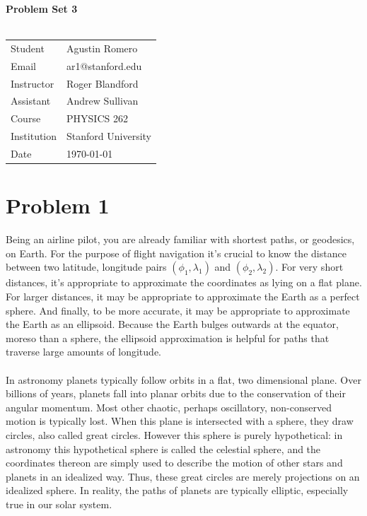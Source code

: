 \documentclass{article}
\begin{document}
\begin{center}
\textbf{\Large{Problem Set 3}}\\~\\
\begin{tabular}{l l}
Student&Agustin Romero\\
Email&ar1@stanford.edu\\
Instructor&Roger Blandford\\
Assistant&Andrew Sullivan\\
Course&PHYSICS 262\\
Institution&Stanford University\\
Date&\today\\
\end{tabular}
\end{center}
\section*{Problem 1}
Being an airline pilot, you are already familiar with shortest paths, or geodesics, on Earth. For the purpose of flight navigation it's crucial to know the distance between two latitude, longitude pairs $(\phi_1,\lambda_1)$ and $(\phi_2,\lambda_2)$. For very short distances, it's appropriate to approximate the coordinates as lying on a flat plane. For larger distances, it may be appropriate to approximate the Earth as a perfect sphere. And finally, to be more accurate, it may be appropriate to approximate the Earth as an ellipsoid. Because the Earth bulges outwards at the equator, moreso than a sphere, the ellipsoid approximation is helpful for paths that traverse large amounts of longitude.\\~\\
In astronomy planets typically follow orbits in a flat, two dimensional plane. Over billions of years, planets fall into planar orbits due to the conservation of their angular momentum. Most other chaotic, perhaps oscillatory, non-conserved motion is typically lost. When this plane is intersected with a sphere, they draw circles, also called great circles. However this sphere is purely hypothetical: in astronomy this hypothetical sphere is called the celestial sphere, and the coordinates thereon are simply used to describe the motion of other stars and planets in an idealized way. Thus, these great circles are merely projections on an idealized sphere. In reality, the paths of planets are typically elliptic, especially true in our solar system.\\~\\
\end{document}
